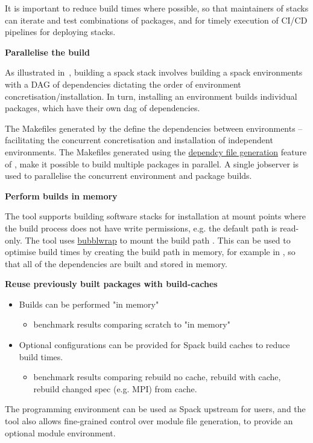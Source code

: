 It is important to reduce build times where possible, so that maintainers of stacks can iterate and test combinations of packages, and for timely execution of CI/CD pipelines for deploying stacks.

\noindent\textbf{Parallelise the build}

As illustrated in~, building a spack stack involves building a spack environments with a DAG of dependencies dictating the order of environment concretisation/installation.
In turn, installing an environment builds individual packages, which have their own dag of dependencies.

The Makefiles generated by the \stackinator define the dependencies between environments -- facilitating the concurrent concretisation and installation of independent environments. The Makefiles generated using the
\href{https://spack.readthedocs.io/en/latest/environments.html#generating-depfiles-from-environments}{dependcy file generation} feature of \spack, make it possible to build multiple packages in parallel.
A single jobserver is used to parallelise the concurrent environment and package builds.

\noindent\textbf{Perform builds in memory}

The \stackinator tool supports building software stacks for installation at mount points where the build process does not have write permissions, e.g. the default  path is read-only.
The tool uses \href{https://github.com/containers/bubblewrap}{bubblwrap} to mount the build path .
This can be used to optimise build times by creating the build path in memory, for example in , so that all of the dependencies are built and stored in memory.

\noindent\textbf{Reuse previously built packages with build-caches}

\begin{itemize}
    \item Builds can be performed "in memory"
    \begin{itemize}
        \item benchmark results comparing scratch to "in memory"
    \end{itemize}
    \item Optional configurations can be provided for Spack build caches to reduce build times.
    \begin{itemize}
        \item benchmark results comparing rebuild no cache, rebuild with cache, rebuild changed spec (e.g. MPI) from cache.
    \end{itemize}
\end{itemize}
The programming environment can be used as Spack upstream for users, and the tool also allows fine-grained control over module file generation, to provide an optional module environment.

